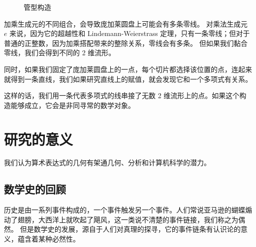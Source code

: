 \documentclass[a4paper,12pt]{article}
\numberwithin{problem}{section}
\numberwithin{definition}{section}
\numberwithin{lemma}{section}
\numberwithin{proposition}{section}
\numberwithin{theorem}{section}
\numberwithin{grammar}{section}
\numberwithin{program}{section}
\numberwithin{convention}{section}
\numberwithin{corollary}{section}
\begin{document}
\begin{figure}[ht]
    \centering
    \caption{管型构造}\label{fig:tube}
\end{figure}

加乘生成元的不同组合，会导致庞加莱圆盘上可能会有多条零线。
对乘法生成元 $e$ 来说，因为它的超越性和 Lindemann-Weierstrass 定理，只有一条零线；但对于普通的正整数，因为加乘搭配带来的整除关系，零线会有多条。
但如果我们黏合零线，我们会得到不同的 2 维流形。

同时，如果我们固定了庞加莱圆盘上的一点，每个切片都选择该位置的点，连起来就得到一条直线，我们如果研究直线上的赋值，就会发现它和一个多项式有关系。

这样的话，我们用一条代表多项式的线串接了无数 2 维流形上的点。如果这个构造能够成立，它会是非同寻常的数学对象。

\newpage

\section{研究的意义}

我们认为算术表达式的几何有架通几何、分析和计算机科学的潜力。

\subsection{数学史的回顾}

历史是由一系列事件构成的，一个事件触发另一个事件。人们常说亚马逊的蝴蝶煽动了翅膀，大西洋上就吹起了飓风，这一类说不清楚的事件链接，我们称之为偶然。
但是数学史的发展，源自于人们对真理的探寻，它的事件链条有认识论的意义，蕴含着某种必然性。
\end{document}
